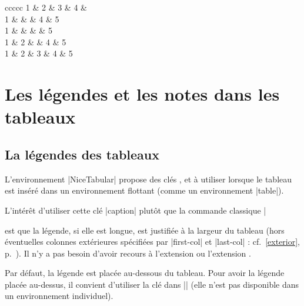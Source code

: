 \documentclass[dvipsnames]{article}
\begin{document}
\bigskip
\begin{Code}[width=10cm,show-output]
\begin{NiceTabular}{ccccc}
1 & 2 & 3 & 4 &   \\
1 &   &   & 4 & 5 \\
1 &   &   &   & 5 \\
1 & 2 &   & 4 & 5 \\
1 & 2 & 3 & 4 & 5 \\
\CodeAfter
  \emph{}
\end{NiceTabular}
\end{Code}





\section{Les légendes et les notes dans les tableaux}

\label{s:notes}

\subsection{La légendes des tableaux}

\label{s:caption}



L'environnement |{NiceTabular}| propose des clés ,  et 
à utiliser lorsque le tableau est inséré dans un environnement flottant (comme
un environnement |{table}|).

\smallskip
L'intérêt d'utiliser cette clé |caption| plutôt que la commande classique
|\caption| est que la légende, si elle est longue, est justifiée à la largeur du
tableau (hors éventuelles colonnes extérieures spécifiées par |first-col| et
|last-col| : cf.~\ref{exterior}, p.~\pageref{exterior}). Il n'y a pas besoin
d'avoir recours à l'extension  ou l'extension
.

\smallskip
Par défaut, la légende est placée au-dessous du tableau. Pour avoir la légende
placée au-dessus, il convient d'utiliser la clé  dans
|\NiceMatrixOptions| (elle n'est pas disponible dans un environnement individuel).
\end{document}
